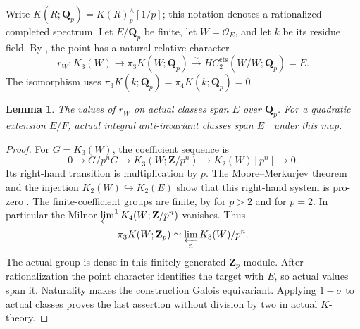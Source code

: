 \documentclass[11pt,a4paper]{article}
\newtheorem{lemma}[theorem]{Lemma}
\theoremstyle{remark}
\begin{document}
Write $K(R;\mathbf Q_p)=K(R)^{\wedge}_p[1/p]$; this notation denotes
a rationalized completed spectrum. Let $E/\mathbf Q_p$ be finite, let
$W=\mathcal O_E$, and let $k$ be its residue field. By
\cite[Proposition~4.10 and Example~4.3]{AMMN}, the point has a natural
relative character
\[
 r_W:K_3(W)\longrightarrow\pi_3K(W;\mathbf Q_p)
 \xrightarrow{\sim}HC_2^{\mathrm{cts}}(W/W;\mathbf Q_p)=E.
\]
The isomorphism uses
$\pi_3K(k;\mathbf Q_p)=\pi_4K(k;\mathbf Q_p)=0$.

\begin{lemma}\label{lem:directtcactualcoefficients}
The values of $r_W$ on actual classes span $E$ over $\mathbf Q_p$.
For a quadratic extension $E/F$, actual integral anti-invariant
classes span $E^{-}$ under this map.
\end{lemma}
\begin{proof}
For $G=K_3(W)$, the coefficient sequence is
\[
 0\longrightarrow G/p^nG\longrightarrow K_3(W;\mathbf Z/p^n)
 \longrightarrow K_2(W)[p^n]\longrightarrow0.
\]
Its right-hand transition is multiplication by $p$. The
Moore--Merkurjev theorem and the injection $K_2(W)\hookrightarrow K_2(E)$
show that this right-hand system is pro-zero
\cite{MerkurjevTorsion}. The finite-coefficient groups are finite,
by \cite[Theorem~A]{HesselholtMadsenLocal} for $p>2$ and
\cite[Theorem~3.7]{RognesWeibelLocal} for $p=2$. In particular the
Milnor $\varprojlim^1 K_4(W;\mathbf Z/p^n)$ vanishes. Thus
\[
 \pi_3K(W;\mathbf Z_p)\simeq\varprojlim_n K_3(W)/p^n.
\]
The actual group is dense in this finitely generated $\mathbf Z_p$-module.
After rationalization the point character identifies the target with
$E$, so actual values span it. Naturality makes the construction
Galois equivariant. Applying $1-\sigma$ to actual classes proves the
last assertion without division by two in actual $K$-theory.
\end{proof}
\end{document}
